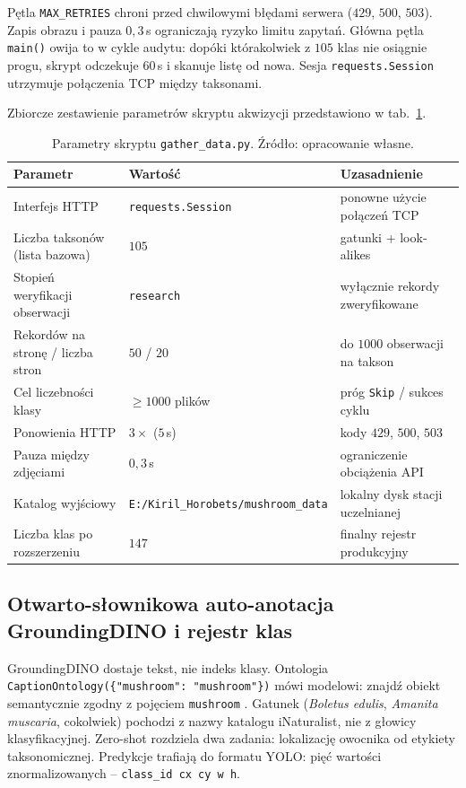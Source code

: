 Pętla \texttt{MAX\_RETRIES} chroni przed chwilowymi błędami serwera ($429$, $500$, $503$). Zapis obrazu i pauza $0{,}3$\,s ograniczają ryzyko limitu zapytań. Główna pętla \texttt{main()} owija to w cykle audytu: dopóki którakolwiek z $105$ klas nie osiągnie progu, skrypt odczekuje $60$\,s i skanuje listę od nowa. Sesja \texttt{requests.Session} utrzymuje połączenia TCP między taksonami.

Zbiorcze zestawienie parametrów skryptu akwizycji przedstawiono w tab.~\ref{tab:scraper}.

\begin{table}[htbp]
 \centering
 \caption{Parametry skryptu \texttt{gather\_data.py}. Źródło: opracowanie własne.}
 \label{tab:scraper}
 \begin{tabular}{|p{5.3cm}|p{3.1cm}|p{4.2cm}|}
 \hline
 \textbf{Parametr} & \textbf{Wartość} & \textbf{Uzasadnienie} \\
 \hline \hline
 Interfejs HTTP & \texttt{requests.Session} & ponowne użycie połączeń TCP \\
 \hline
 Liczba taksonów (lista bazowa) & $105$ & gatunki + look-alikes \\
 \hline
 Stopień weryfikacji obserwacji & \texttt{research} & wyłącznie rekordy zweryfikowane \\
 \hline
 Rekordów na stronę / liczba stron & $50$ / $20$ & do $1000$ obserwacji na takson \\
 \hline
 Cel liczebności klasy & $\geq 1000$ plików & próg \texttt{Skip} / sukces cyklu \\
 \hline
 Ponowienia HTTP & $3\times$ ($5$\,s) & kody $429$, $500$, $503$ \\
 \hline
 Pauza między zdjęciami & $0{,}3$\,s & ograniczenie obciążenia API \\
 \hline
 Katalog wyjściowy & \texttt{E:/Kiril\_Horobets/}\newline\texttt{mushroom\_data} & lokalny dysk stacji uczelnianej \\
 \hline
 Liczba klas po rozszerzeniu & $147$ & finalny rejestr produkcyjny \\
 \hline
 \end{tabular}
\end{table}

\subsection{Otwarto-słownikowa auto-anotacja GroundingDINO i rejestr klas}\label{sec:grounding_dino}
GroundingDINO dostaje tekst, nie indeks klasy. Ontologia \texttt{CaptionOntology(\{"mushroom": "mushroom"\})} mówi modelowi: znajdź obiekt semantycznie zgodny z pojęciem \texttt{mushroom} \cite{liu2023grounding}. Gatunek (\textit{Boletus edulis}, \textit{Amanita muscaria}, cokolwiek) pochodzi z nazwy katalogu iNaturalist, nie z głowicy klasyfikacyjnej. Zero-shot rozdziela dwa zadania: lokalizację owocnika od etykiety taksonomicznej. Predykcje trafiają do formatu YOLO: pięć wartości znormalizowanych – \texttt{class\_id cx cy w h}.

